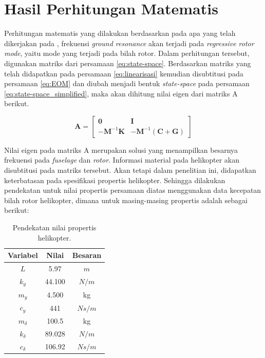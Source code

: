 \section{Hasil Perhitungan Matematis}

Perhitungan matematis yang dilakukan berdasarkan pada apa yang telah dikerjakan pada \cite{BERGEOT201672}, frekuensi \textit{ground resonance} akan terjadi pada \textit{regressive rotor mode}, yaitu mode yang terjadi pada bilah rotor. Dalam perhitungan tersebut, digunakan matriks dari persamaan \ref{eq:state-space}. Berdasarkan matriks yang telah didapatkan pada persamaan \ref{eq:linearisasi} kemudian disubtitusi pada persamaan \ref{eq:EOM} dan diubah menjadi bentuk \textit{state-space} pada persamaan \ref{eq:state-space_simplified}, maka akan dihitung nilai eigen dari matriks A berikut.

\begin{equation}
	\mathbf{A}=\begin{bmatrix}
	\mathbf{0}& \mathbf{I}\\
	\mathbf{-M}^{-1}\mathbf{K}& \mathbf{-M}^{-1}(\mathbf{C}+\mathbf{G})
	\end{bmatrix}
\end{equation}

Nilai eigen pada matriks A merupakan solusi yang menampilkan besarnya frekuensi pada \textit{fuselage} dan \textit{rotor}. Informasi material pada helikopter akan disubtitusi pada matriks tersebut. Akan tetapi dalam penelitian ini, didapatkan keterbatasan pada spesifikasi propertis helikopter. Sehingga dilakukan pendekatan untuk nilai propertis persamaan diatas menggunakan data kecepatan bilah rotor helikopter, dimana untuk masing-masing propertis adalah sebagai berikut:

\begin{table}[h]
	\centering
	\caption{Pendekatan nilai propertis helikopter.}
	\label{tb:propertis}
	\begin{tabular}{|c|c|c|}
		\hline
		Variabel     & Nilai  	& Besaran \\ \hline 
		$L$          & 5.97  	& $m$     \\ \hline
		$k_y$        & 44.100  	& $N/m$   \\ \hline
		$m_y$        & 4.500   	& kg      \\ \hline
		$c_y$        & 441    	& $Ns/m$  \\ \hline
		$m_{\delta}$ & 100.5  	& kg      \\ \hline
		$k_{\delta}$ & 89.028  	& $N/m$   \\ \hline
		$c_{\delta}$ & 106.92 	& $Ns/m$  \\ \hline
	\end{tabular}
\end{table}

